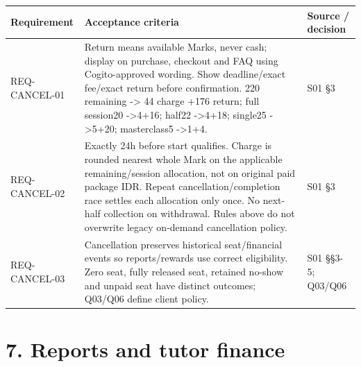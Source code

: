 \documentclass[11pt,a4paper]{article}
\newcounter{none}
\begin{document}
{\def\LTcaptype{none} %
\begin{longtable}[]{@{}
  >{\raggedright\arraybackslash}p{}
  >{\raggedright\arraybackslash}p{}
  >{\raggedright\arraybackslash}p{}@{}}
\toprule\noalign{}
\begin{minipage}[b]{\linewidth}\raggedright
Requirement
\end{minipage} & \begin{minipage}[b]{\linewidth}\raggedright
Acceptance criteria
\end{minipage} & \begin{minipage}[b]{\linewidth}\raggedright
Source / decision
\end{minipage} \\
\midrule\noalign{}
\endhead
\bottomrule\noalign{}
\endlastfoot
REQ-CANCEL-01 & Return means available Marks, never cash; display on purchase, checkout and FAQ using Cogito-approved wording. Show deadline/exact fee/exact return before confirmation. 220 remaining -\textgreater{} 44 charge +176 return; full session20 -\textgreater4+16; half22 -\textgreater4+18; single25 -\textgreater5+20; masterclass5 -\textgreater1+4. & S01 §3 \\
REQ-CANCEL-02 & Exactly 24h before start qualifies. Charge is rounded nearest whole Mark on the applicable remaining/session allocation, not on original paid package IDR. Repeat cancellation/completion race settles each allocation only once. No next-half collection on withdrawal. Rules above do not overwrite legacy on-demand cancellation policy. & S01 §3 \\
REQ-CANCEL-03 & Cancellation preserves historical seat/financial events so reports/rewards use correct eligibility. Zero seat, fully released seat, retained no-show and unpaid seat have distinct outcomes; Q03/Q06 define client policy. & S01 §§3-5; Q03/Q06 \\
\end{longtable}
}

\section{7. Reports and tutor finance}\label{reports-and-tutor-finance}
\end{document}
